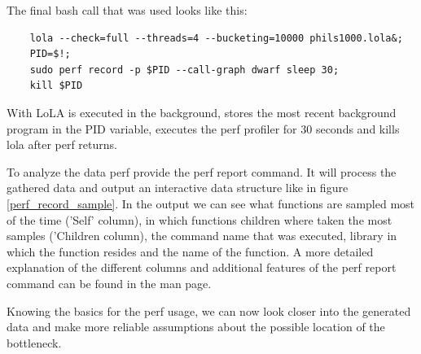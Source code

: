 The final bash call that was used looks like this:
\begin{lstlisting}
    lola --check=full --threads=4 --bucketing=10000 phils1000.lola&;
    PID=$!;
    sudo perf record -p $PID --call-graph dwarf sleep 30;
    kill $PID
\end{lstlisting}
With  LoLA  is executed in the background,  stores the most recent background program in the PID variable,  executes the perf profiler for 30 seconds and  kills lola after perf returns.

To analyze the data perf provide the perf report command. It will process the gathered data and output an interactive data structure like in figure \ref{perf_record_sample}. In the output we can see what functions are sampled most of the time ('Self' column), in which functions children where taken the most samples ('Children column), the command name that was executed, library in which the function resides and the name of the function. A more detailed explanation of the different columns and additional features of the perf report command can be found in the man page.

Knowing the basics for the perf usage, we can now look closer into the generated data and make more reliable assumptions about the possible location of the bottleneck.

